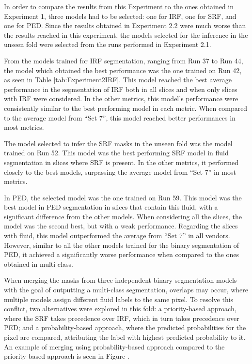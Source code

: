 \par
In order to compare the results from this Experiment to the ones obtained in Experiment 1, three models had to be selected: one for IRF, one for SRF, and one for PED. Since the results obtained in Experiment 2.2 were much worse than the results reached in this experiment, the models selected for the inference in the unseen fold were selected from the runs performed in Experiment 2.1.
\par
From the models trained for IRF segmentation, ranging from Run 37 to Run 44, the model which obtained the best performance was the one trained on Run 42, as seen in Table \ref{tab:Experiment2IRF}. This model reached the best average performance in the segmentation of IRF both in all slices and when only slices with IRF were considered. In the other metrics, this model's performance were consistently similar to the best performing model in each metric. When compared to the average model from ``Set 7'', this model reached better performances in most metrics.
\par
The model selected to infer the SRF masks in the unseen fold was the model trained on Run 52. This model was the best performing SRF model in fluid segmentation in slices where SRF is present. In the other metrics, it performed closely to the best models, surpassing the average model from ``Set 7'' in most metrics.
\par
In PED, the selected model was the one trained on Run 59. This model was the best model in PED segmentation in slices that contain this fluid, with a significant difference from the other models. When considering all the slices, the model was the second best, but with a weak performance. Regarding the slices with fluid, this model outperformed the average from ``Set 7'' in all vendors. However, similar to all the other models trained for the binary segmentation of PED, it achieved a significantly worse performance when compared to the ones obtained in multi-class.
\par
When merging the masks from three independent binary segmentation models with the goal of outputting a multi-class segmentation, overlaps may occur, where multiple models assign different fluid labels to the same pixel. To resolve this conflict, two alternatives were explored in this fold: a priority-based approach, where the SRF takes precedence over IRF, which in turn takes precedence over PED; and a probability-based approach, where the predicted probabilities for the pixel are compared, attributing the label with highest predicted probability to it. An example of merging using probability-based approach compared to the priority based approach is seen in Figure .

